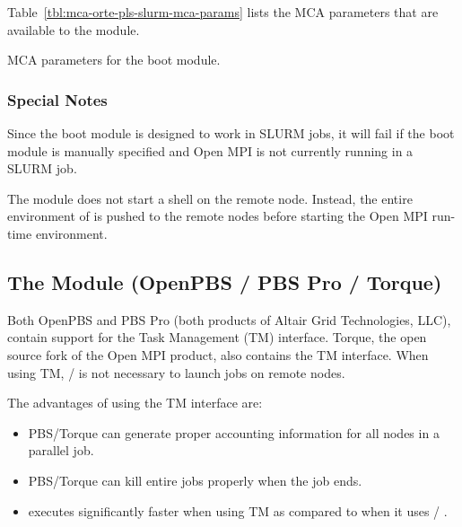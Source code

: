 Table~\ref{tbl:mca-orte-pls-slurm-mca-params} lists the MCA parameters
that are available to the  module.

\begin{table}[htbp]
  \begin{ssiparamtb}
%
  \end{ssiparamtb}
  \caption{MCA parameters for the  boot module.}
  \label{tbl:mca-orte-pls-slurm-mca-params}
\end{table}


\subsubsection{Special Notes}

Since the  boot module is designed to work in SLURM jobs,
it will fail if the  boot module is manually specified and
Open MPI is not currently running in a SLURM job.

The  module does not start a shell on the remote node.
Instead, the entire environment of  is pushed to the
remote nodes before starting the Open MPI run-time environment.
  


\subsection{The  Module (OpenPBS / PBS Pro / Torque)}

Both OpenPBS and PBS Pro (both products of Altair Grid Technologies,
LLC), contain support for the Task Management (TM) interface.  Torque,
the open source fork of the Open MPI product, also contains the TM
interface.  When using TM, / is not necessary to
launch jobs on remote nodes.

The advantages of using the TM interface are:

\begin{itemize}
\item PBS/Torque can generate proper accounting information for all
  nodes in a parallel job.
  
\item PBS/Torque can kill entire jobs properly when the job ends.
  
\item {} executes significantly faster when using TM as
  compared to when it uses  / .
\end{itemize}


